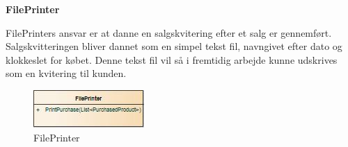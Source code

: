 \textbf{FilePrinter}

FilePrinters ansvar er at danne en salgskvitering efter et salg er gennemført. Salgskvitteringen bliver dannet som en simpel tekst fil, navngivet efter dato og klokkeslet for købet. Denne tekst fil vil så i fremtidig arbejde kunne udskrives som en kvitering til kunden. 

\begin{figure}[H]
    \centering
    \includegraphics[]{Systemdesign/Frontend/DAL/Pics/FilePrinter}
    \caption{FilePrinter}
    \label{fig:FilePrinter}
\end{figure}

\bigskip